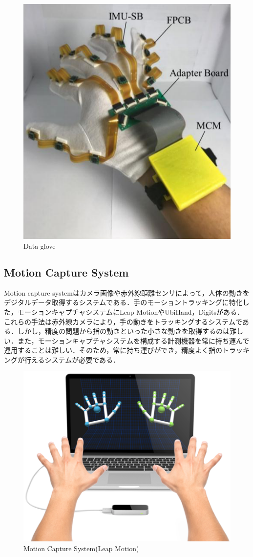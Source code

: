 \begin{figure}[H]
  \centering
  \includegraphics[width=0.6\linewidth]{fig/ch1/data_glove}
  \caption{Data glove\cite{Lin2018}}
  \label{fig:Data glove}
\end{figure}

\subsection*{Motion Capture System}
Motion capture systemはカメラ画像や赤外線距離センサによって，人体の動きをデジタルデータ取得するシステムである．手のモーショントラッキングに特化した，モーションキャプチャシステムにLeap MotionやUbiHand，Digits\cite{Ahmad2006,Kim2012}がある．これらの手法は赤外線カメラにより，手の動きをトラッキングするシステムである．しかし，精度の問題から指の動きといった小さな動きを取得するのは難しい．また，モーションキャプチャシステムを構成する計測機器を常に持ち運んで運用することは難しい．そのため，常に持ち運びができ，精度よく指のトラッキングが行えるシステムが必要である．

\begin{figure}[H]
  \centering
  \includegraphics[width=0.6\linewidth]{fig/ch1/mcs}
  \caption{Motion Capture System(Leap Motion)}
  \label{fig:Motion Capture System}
\end{figure}

